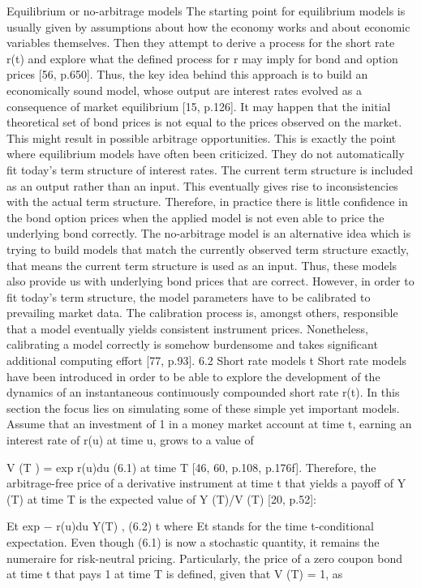 Equilibrium or no-arbitrage models
The starting point for equilibrium models is usually given by 
assumptions about how the economy works and about economic 
variables themselves. Then they attempt to derive a process 
for the short rate r(t) and explore what the defined process 
for r may imply for bond and option prices [56, p.650]. Thus, 
the key idea behind this approach is to build an economically 
sound model, whose output are interest rates evolved as a consequence 
of market equilibrium [15, p.126]. It may happen that the initial 
theoretical set of bond prices is not equal to the prices observed 
on the market. This might result in possible arbitrage opportunities. 
This is exactly the point where equilibrium models have often been criticized. 
They do not automatically fit today’s term structure of interest rates. 
The current term structure is included as an output rather than an input. 
This eventually gives rise to inconsistencies with the actual term structure. 
Therefore, in practice there is little confidence in the bond option 
prices when the applied model is not even able to price the underlying 
bond correctly.
The no-arbitrage model is an alternative idea which is trying to build models that match the currently observed term structure exactly, that means the current term structure is used as an input. Thus, these models also provide us with underlying bond prices that are correct. However, in order to fit today’s term structure, the model parameters have to be calibrated to prevailing market data. The calibration process is, amongst others, responsible that a model eventually yields consistent instrument prices. Nonetheless, calibrating a model correctly is somehow burdensome and takes significant additional computing effort [77, p.93].
6.2 Short rate models
t
Short rate models have been introduced in order to be able to explore the development of the dynamics of an instantaneous continuously compounded short rate r(t). In this section the focus lies on simulating some of these simple yet important models. Assume that an investment of 1 in a money market account at time t, earning an interest rate of r(u) at time u, grows to a value of

V (T ) = exp r(u)du (6.1)
at time T [46, 60, p.108, p.176f]. Therefore, the arbitrage-free price of a derivative instrument at time t that yields a payoff of Y (T) at time T is the expected value of Y (T)/V (T) [20, p.52]:

Et exp − r(u)du Y(T) , (6.2)
t
where Et stands for the time t-conditional expectation. Even though (6.1) is now a stochastic
quantity, it remains the numeraire for risk-neutral pricing. Particularly, the price of a zero
coupon bond at time t that pays 1 at time T is defined, given that V (T) = 1, as 

